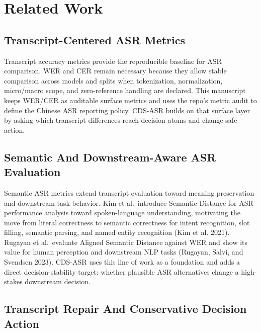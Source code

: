 \documentclass[
]{article}
\begin{document}
\hypertarget{related-work}{%
\section{Related Work}\label{related-work}}

\hypertarget{transcript-centered-asr-metrics}{%
\subsection{Transcript-Centered ASR
Metrics}\label{transcript-centered-asr-metrics}}

Transcript accuracy metrics provide the reproducible baseline for ASR
comparison. WER and CER remain necessary because they allow stable
comparison across models and splits when tokenization, normalization,
micro/macro scope, and zero-reference handling are declared. This
manuscript keeps WER/CER as auditable surface metrics and uses the
repo's metric audit to define the Chinese ASR reporting policy. CDS-ASR
builds on that surface layer by asking which transcript differences
reach decision atoms and change safe action.

\hypertarget{semantic-and-downstream-aware-asr-evaluation}{%
\subsection{Semantic And Downstream-Aware ASR
Evaluation}\label{semantic-and-downstream-aware-asr-evaluation}}

Semantic ASR metrics extend transcript evaluation toward meaning
preservation and downstream task behavior. Kim et al.~introduce Semantic
Distance for ASR performance analysis toward spoken-language
understanding, motivating the move from literal correctness to semantic
correctness for intent recognition, slot filling, semantic parsing, and
named entity recognition (Kim et al. 2021). Rugayan et al.~evaluate
Aligned Semantic Distance against WER and show its value for human
perception and downstream NLP tasks (Rugayan, Salvi, and Svendsen 2023).
CDS-ASR uses this line of work as a foundation and adds a direct
decision-stability target: whether plausible ASR alternatives change a
high-stakes downstream decision.

\hypertarget{transcript-repair-and-conservative-decision-action}{%
\subsection{Transcript Repair And Conservative Decision
Action}\label{transcript-repair-and-conservative-decision-action}}
\end{document}
